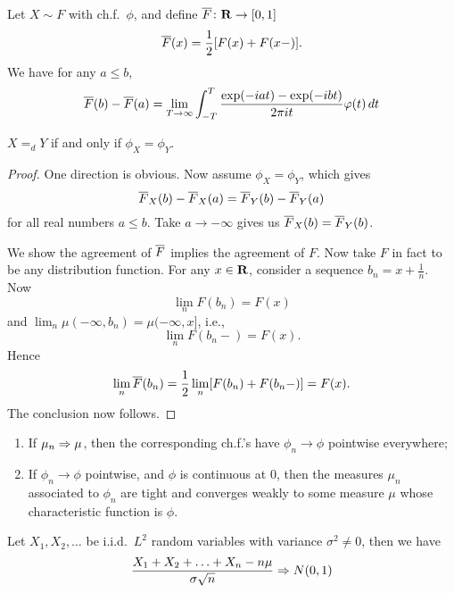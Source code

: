 \begin{namedthm}
    Let $X \sim F$ with ch.f.\ $\phi$, and define $\overline{F}\colon \mathbf{R} \to [0,1]$ \[
        \overline{F}(x) = \frac{1}{2}[F(x) + F(x-)].
    \]
    We have for any $a\leq b$, \[
         \overline{F}(b) - \overline{F}(a)= \lim_{T \to \infty} \int_{-T}^T \frac{\exp(-iat) - \exp(-ibt)}{2\pi it} \varphi(t)\,dt
    \]
\end{namedthm}

\begin{thm}
    $X=_d Y$ if and only if $\phi_X = \phi_Y$.
\end{thm}
\begin{proof}
    One direction is obvious. Now assume $\phi_X = \phi_Y$, which gives \[
        \overline{F}_X(b) - \overline{F}_X(a) = \overline{F}_Y(b) - \overline{F}_Y(a)
    \] for all real numbers $a \leq b$. Take $a \to -\infty$ gives us $\overline{F}_X(b) = \overline{F}_Y(b)$.
    
    We show the agreement of $\overline{F}$ implies the agreement of $F$. Now take $F$ in fact to be any distribution function.
    For any $x\in \mathbf{R}$, consider a sequence $b_n = x+ \frac{1}{n}$. Now \[
        \lim_{n} F(b_n) = F(x)
    \] and $
        \lim_{n} \mu(-\infty, b_n) = \mu(-\infty, x]
    $, i.e., \[\lim_n F(b_n - ) = F(x).\] Hence \[
        \lim_{n} \overline{F}(b_n) = \frac{1}{2} \lim_{n} [F(b_n) + F(b_n-)] = F(x).
    \] The conclusion now follows.
\end{proof}

\begin{thm} \leavevmode
    \begin{enumerate}
        \item If $\mu_n \Rightarrow \mu$, then the corresponding ch.f.'s have $\phi_n \to \phi$ pointwise everywhere;
        \item If $\phi_n \to \phi$ pointwise, and $\phi$ is continuous at $0$, then the measures $\mu_n$ associated to $\phi_n$ are tight and converges weakly to some measure $\mu$ whose characteristic function is $\phi$.
    \end{enumerate}
\end{thm}

\begin{namedthm}
    Let $X_1,X_2,\dotsc$ be i.i.d.\ $L^2$ random variables with variance $\sigma^2 \neq 0$, then we have\[
        \frac{X_1 + X_2 + \dotsc + X_n - n \mu}{\sigma \sqrt{n}} \Rightarrow N(0,1)
    \]
\end{namedthm}

